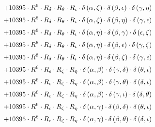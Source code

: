 \begin{subequations}
\begin{gather}
 \\[0.2em] \notag 		 + 10395 \cdot R^{6} \cdot R_{\delta{}} \cdot R_{\theta{}} \cdot R_{\iota{}} \cdot \delta{}\left(\alpha{}, \zeta{}\right) \cdot \delta{}\left(\beta{}, \epsilon{}\right) \cdot \delta{}\left(\gamma{}, \eta{}\right) 
 \\[0.2em] \notag 		 + 10395 \cdot R^{6} \cdot R_{\delta{}} \cdot R_{\theta{}} \cdot R_{\iota{}} \cdot \delta{}\left(\alpha{}, \zeta{}\right) \cdot \delta{}\left(\beta{}, \eta{}\right) \cdot \delta{}\left(\gamma{}, \epsilon{}\right) 
 \\[0.2em] \notag 		 + 10395 \cdot R^{6} \cdot R_{\delta{}} \cdot R_{\theta{}} \cdot R_{\iota{}} \cdot \delta{}\left(\alpha{}, \eta{}\right) \cdot \delta{}\left(\beta{}, \gamma{}\right) \cdot \delta{}\left(\epsilon{}, \zeta{}\right) 
 \\[0.2em] \notag 		 + 10395 \cdot R^{6} \cdot R_{\delta{}} \cdot R_{\theta{}} \cdot R_{\iota{}} \cdot \delta{}\left(\alpha{}, \eta{}\right) \cdot \delta{}\left(\beta{}, \epsilon{}\right) \cdot \delta{}\left(\gamma{}, \zeta{}\right) 
 \\[0.2em] \notag 		 + 10395 \cdot R^{6} \cdot R_{\delta{}} \cdot R_{\theta{}} \cdot R_{\iota{}} \cdot \delta{}\left(\alpha{}, \eta{}\right) \cdot \delta{}\left(\beta{}, \zeta{}\right) \cdot \delta{}\left(\gamma{}, \epsilon{}\right) 
 \\[0.2em] \notag 		 + 10395 \cdot R^{6} \cdot R_{\epsilon{}} \cdot R_{\zeta{}} \cdot R_{\eta{}} \cdot \delta{}\left(\alpha{}, \beta{}\right) \cdot \delta{}\left(\gamma{}, \delta{}\right) \cdot \delta{}\left(\theta{}, \iota{}\right) 
 \\[0.2em] \notag 		 + 10395 \cdot R^{6} \cdot R_{\epsilon{}} \cdot R_{\zeta{}} \cdot R_{\eta{}} \cdot \delta{}\left(\alpha{}, \beta{}\right) \cdot \delta{}\left(\gamma{}, \theta{}\right) \cdot \delta{}\left(\delta{}, \iota{}\right) 
 \\[0.2em] \notag 		 + 10395 \cdot R^{6} \cdot R_{\epsilon{}} \cdot R_{\zeta{}} \cdot R_{\eta{}} \cdot \delta{}\left(\alpha{}, \beta{}\right) \cdot \delta{}\left(\gamma{}, \iota{}\right) \cdot \delta{}\left(\delta{}, \theta{}\right) 
 \\[0.2em] \notag 		 + 10395 \cdot R^{6} \cdot R_{\epsilon{}} \cdot R_{\zeta{}} \cdot R_{\eta{}} \cdot \delta{}\left(\alpha{}, \gamma{}\right) \cdot \delta{}\left(\beta{}, \delta{}\right) \cdot \delta{}\left(\theta{}, \iota{}\right) 
 \\[0.2em] \notag 		 + 10395 \cdot R^{6} \cdot R_{\epsilon{}} \cdot R_{\zeta{}} \cdot R_{\eta{}} \cdot \delta{}\left(\alpha{}, \gamma{}\right) \cdot \delta{}\left(\beta{}, \theta{}\right) \cdot \delta{}\left(\delta{}, \iota{}\right) 

\end{gather}
\end{subequations}
